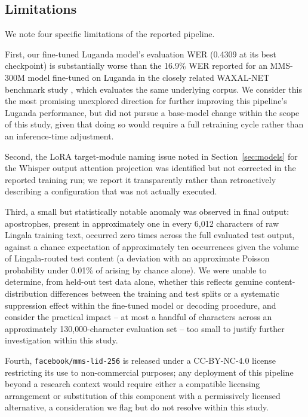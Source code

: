 \documentclass[11pt]{article}
\begin{document}
\subsection{Limitations}
\label{sec:limitations}

We note four specific limitations of the reported pipeline.

First, our fine-tuned Luganda model's evaluation WER (0.4309 at its best checkpoint) is substantially worse than the 16.9\% WER reported for an MMS-300M model fine-tuned on Luganda in the closely related WAXAL-NET benchmark study \cite{olufemi2026waxalnet}, which evaluates the same underlying corpus. We consider this the most promising unexplored direction for further improving this pipeline's Luganda performance, but did not pursue a base-model change within the scope of this study, given that doing so would require a full retraining cycle rather than an inference-time adjustment.

Second, the LoRA target-module naming issue noted in Section~\ref{sec:models} for the Whisper output attention projection was identified but not corrected in the reported training run; we report it transparently rather than retroactively describing a configuration that was not actually executed.

Third, a small but statistically notable anomaly was observed in final output: apostrophes, present in approximately one in every 6{,}012 characters of raw Lingala training text, occurred zero times across the full evaluated test output, against a chance expectation of approximately ten occurrences given the volume of Lingala-routed test content (a deviation with an approximate Poisson probability under 0.01\% of arising by chance alone). We were unable to determine, from held-out test data alone, whether this reflects genuine content-distribution differences between the training and test splits or a systematic suppression effect within the fine-tuned model or decoding procedure, and consider the practical impact -- at most a handful of characters across an approximately 130{,}000-character evaluation set -- too small to justify further investigation within this study.

Fourth, \texttt{facebook/mms-lid-256} is released under a CC-BY-NC-4.0 license restricting its use to non-commercial purposes; any deployment of this pipeline beyond a research context would require either a compatible licensing arrangement or substitution of this component with a permissively licensed alternative, a consideration we flag but do not resolve within this study.
\end{document}
